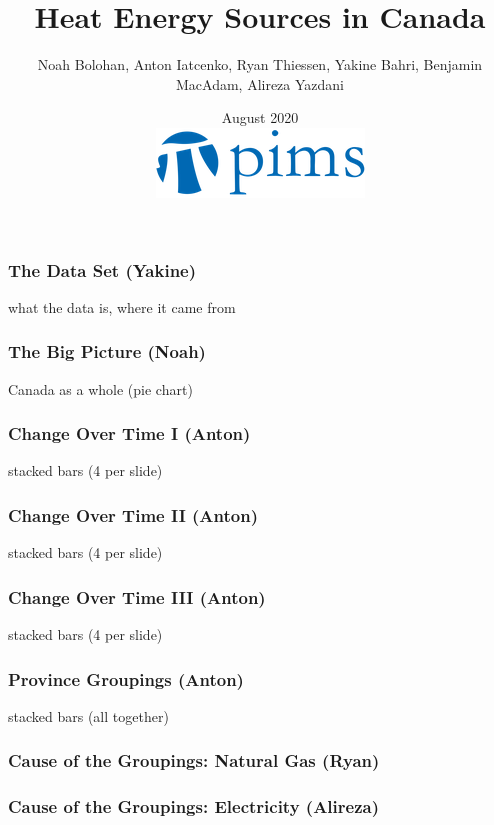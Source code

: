 \documentclass{beamer}
\title{Heat Energy Sources in Canada}
\author{Noah Bolohan, Anton Iatcenko, Ryan Thiessen, Yakine Bahri, Benjamin MacAdam, Alireza Yazdani}
\institute{Math\textsuperscript{Industry}}
\date{August 2020  \\ \vspace{30pt} \includegraphics[scale=0.3]{pims_logo.png} }
\begin{document}
\frame{\titlepage}

\begin{frame}
\frametitle{The Data Set (Yakine)}
what the data is, where it came from
\end{frame}


\begin{frame}
\frametitle{The Big Picture (Noah)}
Canada as a whole (pie chart)
\end{frame}


\begin{frame}
\frametitle{Change Over Time I (Anton)}
stacked bars (4 per slide)
\end{frame}


\begin{frame}
\frametitle{Change Over Time II (Anton)}
stacked bars (4 per slide)
\end{frame}


\begin{frame}
\frametitle{Change Over Time III (Anton)}
stacked bars (4 per slide)
\end{frame}


\begin{frame}
\frametitle{Province Groupings (Anton)}
stacked bars (all together)
\end{frame}


\begin{frame}
\frametitle{Cause of the Groupings: Natural Gas (Ryan)}

\end{frame}


\begin{frame}
\frametitle{Cause of the Groupings: Electricity (Alireza)}

\end{frame}
\end{document}
